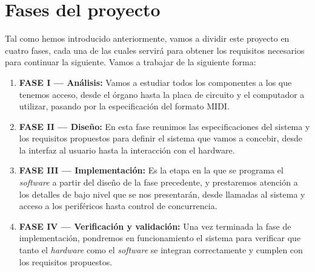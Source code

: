 \section{Fases del proyecto}

Tal como hemos introducido anteriormente, vamos a dividir este proyecto en cuatro fases, cada una de las cuales servirá para obtener los requisitos necesarios para continuar la siguiente. Vamos a trabajar de la siguiente forma:

\begin{enumerate}
	\item \textbf{FASE I --- Análisis:} Vamos a estudiar todos los componentes a los que tenemos acceso, desde el órgano hasta la placa de circuito y el computador a utilizar, pasando por la especificación del formato MIDI.
	
	\item \textbf{FASE II --- Diseño:} En esta fase reunimos las especificaciones del sistema y los requisitos propuestos para definir el sistema que vamos a concebir, desde la interfaz al usuario hasta la interacción con el hardware.
	
	\item \textbf{FASE III --- Implementación:} Es la etapa en la que se programa el \textit{software} a partir del diseño de la fase precedente, y prestaremos atención a los detalles de bajo nivel que se nos presentarán, desde llamadas al sistema y acceso a los periféricos hasta control de concurrencia.
	
	\item \textbf{FASE IV --- Verificación y validación:} Una vez terminada la fase de implementación, pondremos en funcionamiento el sistema para verificar que tanto el \textit{hardware} como el \textit{software} se integran correctamente y cumplen con los requisitos propuestos.
	
\end{enumerate}

\clearpage{\cleardoublepage}
\clearpage{\pagestyle{empty}\cleardoublepage}
